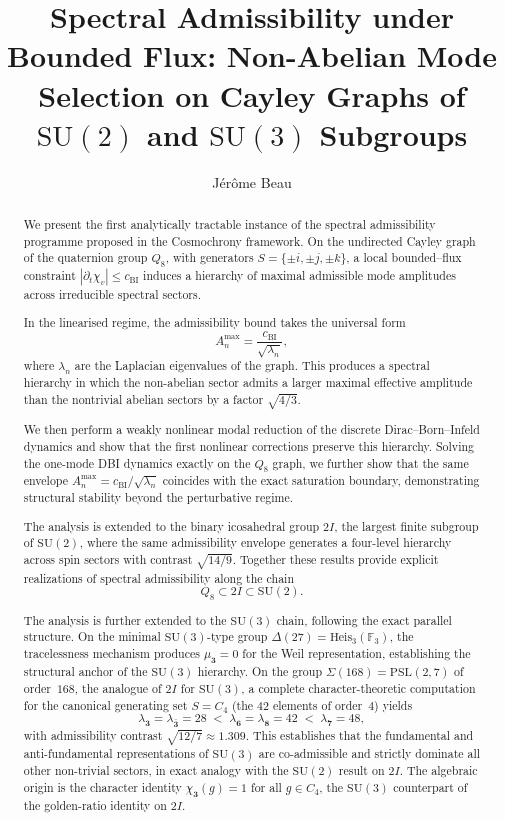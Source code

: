\documentclass[11pt,a4paper]{article}
\title{Spectral Admissibility under Bounded Flux:
Non-Abelian Mode Selection on Cayley Graphs of $\mathrm{SU}(2)$
and $\mathrm{SU}(3)$ Subgroups}
\author{Jérôme Beau}
\begin{document}
  \maketitle

  \begin{abstract}
We present the first analytically tractable instance of the spectral admissibility
programme proposed in the Cosmochrony framework.
On the undirected Cayley graph of the quaternion group $Q_8$, with generators
$S=\{\pm i,\pm j,\pm k\}$, a local bounded–flux constraint
$|\partial_t\chi_v|\le c_{\mathrm{BI}}$ induces a hierarchy of maximal admissible
mode amplitudes across irreducible spectral sectors.

In the linearised regime, the admissibility bound takes the universal form
\[
  A_n^{\max}=\frac{c_{\mathrm{BI}}}{\sqrt{\lambda_n}},
\]
where $\lambda_n$ are the Laplacian eigenvalues of the graph.
This produces a spectral hierarchy in which the non-abelian sector
admits a larger maximal effective amplitude than the nontrivial abelian sectors
by a factor $\sqrt{4/3}$.

We then perform a weakly nonlinear modal reduction of the discrete
Dirac–Born–Infeld dynamics and show that the first nonlinear corrections
preserve this hierarchy.
Solving the one-mode DBI dynamics exactly on the $Q_8$ graph, we further show
that the same envelope $A_n^{\max}=c_{\mathrm{BI}}/\sqrt{\lambda_n}$ coincides with the
exact saturation boundary, demonstrating structural stability beyond the
perturbative regime.

The analysis is extended to the binary icosahedral group $2I$, the largest finite
subgroup of $\mathrm{SU}(2)$, where the same admissibility envelope generates
a four-level hierarchy across spin sectors with contrast $\sqrt{14/9}$.
Together these results provide explicit realizations of spectral admissibility
along the chain
\[
  Q_8 \subset 2I \subset \mathrm{SU}(2).
\]

The analysis is further extended to the $\mathrm{SU}(3)$ chain, following the exact parallel
structure.
On the minimal $\mathrm{SU}(3)$-type group $\Delta(27) = \mathrm{Heis}_3(\mathbb{F}_3)$, the
tracelessness mechanism produces $\mu_{\mathbf{3}} = 0$ for the Weil representation, establishing
the structural anchor of the $\mathrm{SU}(3)$ hierarchy.
On the group $\Sigma(168) = \mathrm{PSL}(2,7)$ of order~$168$, the analogue of $2I$ for
$\mathrm{SU}(3)$, a complete character-theoretic computation for the canonical generating set
$S = C_4$ (the $42$ elements of order~$4$) yields
\[
  \lambda_{\mathbf{3}} = \lambda_{\bar{\mathbf{3}}} = 28
  \;<\;
  \lambda_{\mathbf{6}} = \lambda_{\mathbf{8}} = 42
  \;<\;
  \lambda_{\mathbf{7}} = 48,
\]
with admissibility contrast $\sqrt{12/7} \approx 1.309$.
This establishes that the fundamental and anti-fundamental representations of $\mathrm{SU}(3)$
are co-admissible and strictly dominate all other non-trivial sectors, in exact analogy with the
$\mathrm{SU}(2)$ result on $2I$.
The algebraic origin is the character identity $\chi_{\mathbf{3}}(g) = 1$ for all $g \in C_4$,
the $\mathrm{SU}(3)$ counterpart of the golden-ratio identity on $2I$.


\end{abstract}
\end{document}

